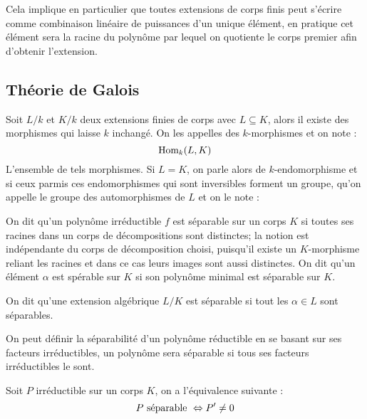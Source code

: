 \documentclass[a4paper]{article} %
\numberwithin{section}{part}
\numberwithin{equation}{section}
\begin{document}
Cela implique en particulier que toutes extensions de corps finis peut s'écrire
comme combinaison linéaire de puissances d'un unique élément, en pratique cet
élément sera la racine du polynôme par lequel on quotiente le corps premier afin
d'obtenir l'extension.

\subsection{Théorie de Galois}
Soit $L/k$ et $K/k$ deux extensions finies de corps avec $L\subseteq K$, alors 
il existe des morphismes qui laisse $k$ inchangé. On les appelles des 
$k$-morphismes et on note :
\[\textup{Hom}_k(L, K)\]
L'ensemble de tels morphismes. Si $L = K$, on parle alors de $k$-endomorphisme
et si ceux parmis ces endomorphismes qui sont inversibles forment un groupe,
qu'on appelle le groupe des automorphismes de $L$ et on le note :

\vspace{0.3cm}

On dit qu'un polynôme irréductible $f$ est séparable sur un corps $K$ si toutes
ses racines dans un corps de décompositions sont distinctes; la notion est
indépendante du corps de décomposition choisi, puisqu'il existe un $K$-morphisme
reliant les racines et dans ce cas leurs images sont aussi distinctes. On dit
qu'un élément $\alpha$ est spérable sur $K$ si son polynôme minimal est 
séparable sur $K$.

\begin{defn}
\label{defsep}
On dit qu'une extension algébrique $L/K$ est séparable si tout les $\alpha\in L$
sont séparables.
\end{defn}

\begin{rem}
On peut définir la séparabilité d'un polynôme réductible en se basant sur ses
facteurs irréductibles, un polynôme sera séparable si tous ses facteurs
irréductibles le sont.
\end{rem}

\begin{prop}
\label{sepder}
Soit $P$ irréductible sur un corps $K$, on a l'équivalence suivante :
\[P\textup{ séparable } \Leftrightarrow P'\neq 0\]
\end{prop}
\end{document}
